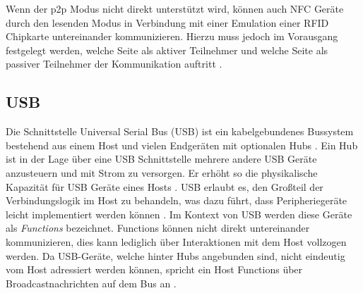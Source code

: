 	Wenn der p2p Modus nicht direkt unterstützt wird, können auch NFC Geräte durch den lesenden Modus in Verbindung mit einer Emulation einer RFID Chipkarte untereinander kommunizieren. Hierzu muss jedoch im Vorausgang festgelegt werden, welche Seite als aktiver Teilnehmer und welche Seite als passiver Teilnehmer der Kommunikation auftritt \cite[S.101]{Langer}.
	
	\subsection{USB}
	Die Schnittstelle Universal Serial Bus (USB) ist ein kabelgebundenes Bussystem bestehend aus einem Host und vielen Endgeräten mit optionalen Hubs \cite[S.23f]{Kelm}. Ein Hub ist in der Lage über eine USB Schnittstelle mehrere andere USB Geräte anzusteuern und mit Strom zu versorgen. Er erhöht so die physikalische Kapazität für USB Geräte eines Hosts \cite[S.40]{Kelm}. USB erlaubt es, den Großteil der Verbindungslogik im Host zu behandeln, was dazu führt, dass Peripheriegeräte leicht implementiert werden können \cite[S.37]{axelson}. Im Kontext von USB werden diese Geräte als {\it Functions} bezeichnet. Functions können nicht direkt untereinander kommunizieren, dies kann lediglich über Interaktionen mit dem Host vollzogen werden. Da USB-Geräte, welche hinter Hubs angebunden sind, nicht eindeutig vom Host adressiert werden können, spricht ein Host Functions über Broadcastnachrichten auf dem Bus an \cite[S.41]{Kelm}.
	
